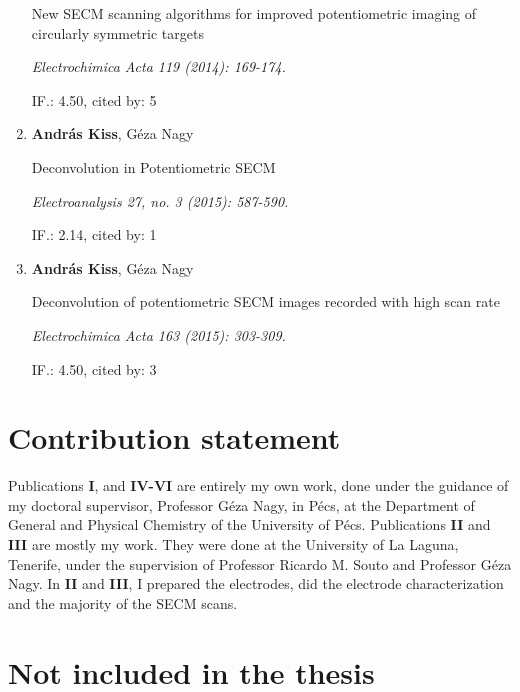 \begin{enumerate}
New SECM scanning algorithms for improved potentiometric imaging of circularly symmetric targets 

\emph{Electrochimica Acta 119 (2014): 169-174.}

IF.: 4.50, cited by: 5

\item \textbf{András Kiss}, Géza Nagy

Deconvolution in Potentiometric SECM

\emph{Electroanalysis 27, no. 3 (2015): 587-590.}

IF.: 2.14, cited by: 1

\item \textbf{András Kiss}, Géza Nagy

Deconvolution of potentiometric SECM images recorded with high scan rate

\emph{Electrochimica Acta 163 (2015): 303-309.}

IF.: 4.50, cited by: 3

\end{enumerate}
\section*{Contribution statement}
Publications \textbf{I}, and \textbf{IV-VI} are entirely my own work, done under the guidance of my doctoral supervisor, Professor Géza Nagy, in Pécs, at the Department of General and Physical Chemistry of the University of Pécs.
Publications \textbf{II} and \textbf{III} are mostly my work.
They were done at the University of La Laguna, Tenerife, under the supervision of Professor Ricardo M. Souto and Professor Géza Nagy.
In \textbf{II} and \textbf{III}, I prepared the electrodes, did the electrode characterization and the majority of the SECM scans. 
\section*{Not included in the thesis}

